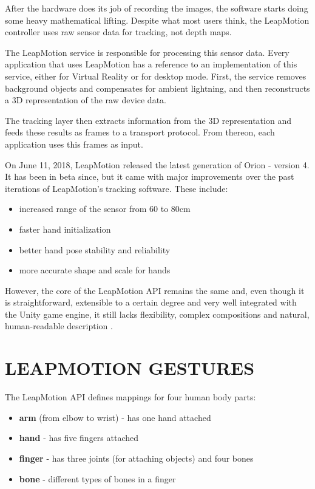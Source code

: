 \documentclass{sigchi}
\def\leap{LeapMotion}
\def\vr{Virtual Reality}
\begin{document}
After the hardware does its job of recording the images, the software starts doing some heavy mathematical lifting. Despite what most users think, the \leap{} controller uses raw sensor data for tracking, not depth maps.

The \leap{} service is responsible for processing this sensor data. Every application that uses \leap{} has a reference to an implementation of this service, either for \vr{} or for desktop mode. First, the service removes background objects and compensates for ambient lightning, and then reconstructs a 3D representation of the raw device data.

The tracking layer then extracts information from the 3D representation and feeds these results as frames to a transport protocol. From thereon, each application uses this frames as input.


On June 11, 2018, \leap{} released the latest generation of Orion - version 4. It has been in beta since, but it came with major improvements over the past iterations of \leap{}'s tracking software. These include:

\begin{itemize}
  \item increased range of the sensor from 60 to 80cm
  \item faster hand initialization
  \item better hand pose stability and reliability
  \item more accurate shape and scale for hands
\end{itemize}

However, the core of the \leap{} API remains the same and, even though it is straightforward, extensible to a certain degree and very well integrated with the Unity game engine, it still lacks flexibility, complex compositions and natural, human-readable description \cite{LMAPI}.

\section{LEAPMOTION GESTURES}

The \leap{} API \cite{LMAPI} defines mappings for four human body parts:

\begin{itemize}
  \item \textbf{arm} (from elbow to wrist) - has one hand attached
  \item \textbf{hand} - has five fingers attached
  \item \textbf{finger} - has three joints (for attaching objects) and four bones
  \item \textbf{bone} - different types of bones in a finger
\end{itemize}
\end{document}
